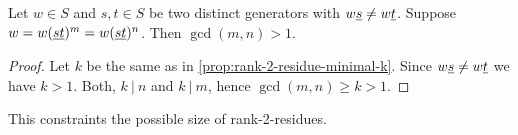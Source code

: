 \begin{coro}
	Let $w \in S$ and $s,t \in S$ be two distinct generators with $w \underline{s} \neq w \underline{t}$. Suppose $w = w(\underline{s} \underline{t})^m = w(\underline{s} \underline{t})^n$. Then $\gcd(m,n) > 1$.

	\begin{proof}
		Let $k$ be the same as in \ref{prop:rank-2-residue-minimal-k}. Since $w \underline{s} \neq w \underline{t}$ we have $k > 1$. Both, $k \ | \ n$ and $k \ | \ m$, hence $\gcd(m,n) \geq k > 1$.
	\end{proof}
\end{coro}

This constraints the possible size of rank-2-residues.